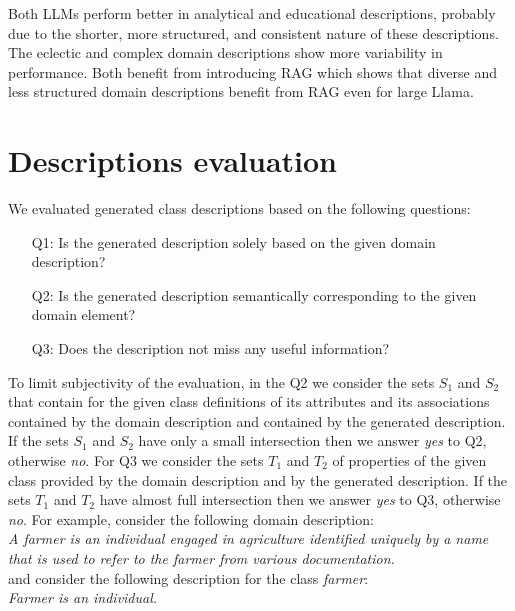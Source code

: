 Both LLMs perform better in analytical and educational descriptions, probably due to the shorter, more structured, and consistent nature of these descriptions.
The eclectic and complex domain descriptions show more variability in performance.
Both benefit from introducing RAG which shows that diverse and less structured domain descriptions benefit from RAG even for large Llama.


\section{Descriptions evaluation}

We evaluated generated class descriptions based on the following questions:

\begin{enumerate}
\item [Q1:] Is the generated description solely based on the given domain description?
\item [Q2:] Is the generated description semantically corresponding to the given domain element?
\item [Q3:] Does the description not miss any useful information?
\end{enumerate}

To limit subjectivity of the evaluation, in the Q2 we consider the sets $S_1$ and $S_2$ that contain for the given class definitions of its attributes and its associations contained by the domain description and contained by the generated description. If the sets $S_1$ and $S_2$ have only a small intersection then we answer \textit{yes} to Q2, otherwise \textit{no}. For Q3 we consider the sets $T_1$ and $T_2$ of properties of the given class provided by the domain description and by the generated description. If the sets $T_1$ and $T_2$ have almost full intersection then we answer \textit{yes} to Q3, otherwise \textit{no}. For example, consider the following domain description: \\

\noindent{}\textit{A farmer is an individual engaged in agriculture identified uniquely by a name that is used to refer to the farmer from various documentation.} \\

\noindent{}and consider the following description for the class \textit{farmer}: \\

\noindent{}\textit{Farmer is an individual.} \\

